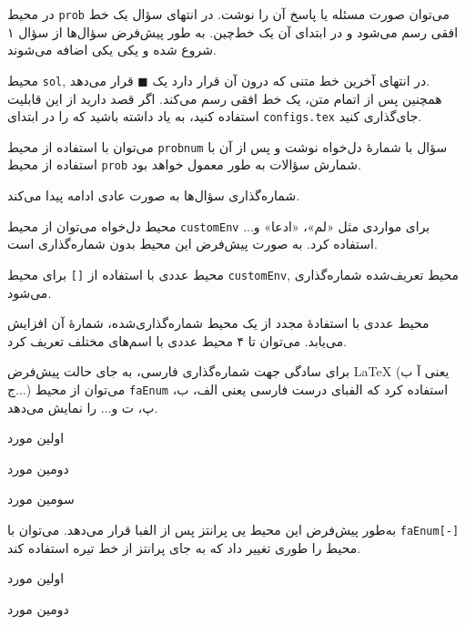 \begin{prob}
	در محیط
	\texttt{prob}
	می‌توان صورت مسئله یا پاسخ آن را نوشت.  در انتهای سؤال یک خط افقی رسم می‌شود و در ابتدای آن یک خط‌چین. به طور پیش‌فرض سؤال‌ها از سؤال ۱ شروع شده و یکی یکی اضافه می‌شوند.
	
\end{prob}
\begin{sol}
	محیط
	\texttt{sol},
	در انتهای آخرین خط متنی که درون آن قرار دارد یک 
	$ \blacksquare $
	قرار می‌دهد.\\	
	همچنین پس از اتمام متن، یک خط افقی رسم می‌کند. اگر قصد دارید از این قابلیت استفاده کنید، به یاد داشته باشید که 
	را در ابتدای 
	\texttt{configs.tex}
	جای‌گذاری کنید.
\end{sol}
\begin{probnum}{10}
	می‌توان با استفاده از محیط
	\texttt{probnum}
	سؤال با شمارهٔ دل‌خواه نوشت و پس از آن با استفاده از محیط 
	\texttt{prob}
	شمارش سؤالات به طور معمول خواهد بود.
	
\end{probnum}
\begin{prob}
	شماره‌گذاری سؤال‌ها به صورت عادی ادامه پیدا می‌کند.
	
\end{prob}
\begin{sol}

\begin{customEnv}{محیط دل‌خواه}
	می‌توان از محیط
	\texttt{customEnv}
	برای مواردی مثل «لم»، «ادعا» و... استفاده کرد. به صورت پیش‌فرض این محیط بدون شماره‌گذاری است.
\end{customEnv}
\begin{customEnv}[]{محیط عددی}
	با استفاده از
	\texttt{[]}
	برای محیط
	\texttt{customEnv},
	محیط تعریف‌شده شماره‌گذاری می‌شود.
\end{customEnv}
\begin{customEnv}[]{محیط عددی}
	با استفادهٔ مجدد از یک محیط شماره‌گذاری‌شده، شمارهٔ آن افزایش می‌یابد. ‌می‌توان تا ۴ محیط عددی با اسم‌های مختلف تعریف کرد.
\end{customEnv}
برای سادگی جهت شماره‌گذاری فارسی، به جای حالت پیش‌فرض
\LaTeX
(یعنی آ ب ج...) می‌توان از محیط
\texttt{faEnum}
استفاده کرد که الفبای درست فارسی یعنی الف، ب، پ، ت و... را نمایش می‌دهد.
\begin{faEnum}
\item اولین مورد
\item دومین مورد
\item سومین مورد
\end{faEnum}
 به‌طور پیش‌فرض این محیط یی پرانتز پس از الفبا قرار می‌دهد. می‌توان با
\texttt{faEnum[-]}
محیط را طوری تغییر داد که به جای پرانتز از خط تیره استفاده کند.
\begin{faEnum}[-]
\item اولین مورد
\item دومین مورد
\end{faEnum}
\end{sol}
